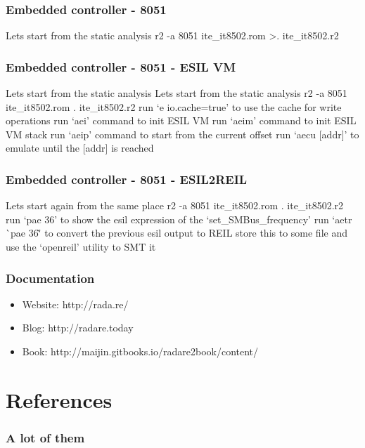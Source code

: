 \documentclass[10pt,pdf,utf8,english,compress,hyperref={unicode}]{beamer}
\begin{document}
\begin{frame}[fragile]
  \frametitle{Embedded controller - 8051}
  \center Lets start from the static analysis
  \center r2 -a 8051 ite\_it8502.rom
  \center >. ite\_it8502.r2
\end{frame}


\begin{frame}[fragile]
  \frametitle{Embedded controller - 8051 - ESIL VM}
\ifxetex
  \center Lets start from the static analysis
\else
  \center Lets start from the static analysis 
\fi
  \center r2 -a 8051 ite\_it8502.rom
  \center . ite\_it8502.r2
  \center run `e io.cache=true' to use the cache for write operations
  \center run `aei' command to init ESIL VM
  \center run `aeim' command to init ESIL VM stack
  \center run `aeip' command to start from the current offset
  \center run `aecu [addr]' to emulate until the [addr] is reached
\end{frame}

\begin{frame}[fragile]
  \frametitle{Embedded controller - 8051 - ESIL2REIL}
  \center Lets start again from the same place
  \center r2 -a 8051 ite\_it8502.rom
  \center . ite\_it8502.r2
  \center run `pae 36' to show the esil expression of the `set\_SMBus\_frequency'
  \center run `aetr \`{}pae 36\`' to convert the previous esil output to REIL
  \center store this to some file and use the `openreil' utility to SMT it
\end{frame}

\begin{frame}[fragile]
  \frametitle{Documentation}
    \begin{itemize}
    \item \alert{Website:} http://rada.re/
    \item \alert{Blog:} http://radare.today
    \item \alert{Book:} http://maijin.gitbooks.io/radare2book/content/
    \end{itemize}
\end{frame}

\ifxetex
\else
\section{References}
\begin{frame}[allowframebreaks]
	\frametitle{A lot of them}
	\printbibliography
\end{frame}
\fi
\end{document}
